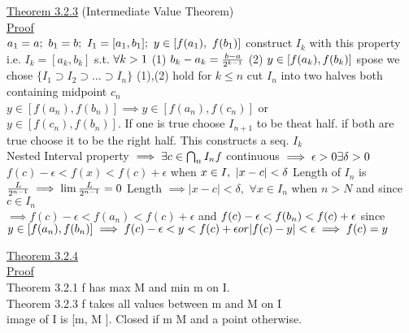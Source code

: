 \documentclass[12pt]{amsart}
\begin{document}
\begin{enumerate}
\underline{Theorem 3.2.3} (Intermediate Value Theorem)\\
\underline{Proof}\\
$a_1 = a;\,\, b_1 = b;\,\, I_1 = [a_1, b_1];\,\, y \in [f(a_1),\,\, f(b_1)]\\$
construct $I_k$ with this property\\
i.e. $I_k = [a_k, b_k]$ s.t. $\forall k >1\\$
(1) $b_k - a_k = \frac{b-a}{2^{k-1}}\\$
(2) $y \in [f(a_k), f(b_k)]\\$
spose we chose $\{ I_1 \supset I_2 \supset \dots \supset I_n \}$ (1),(2) hold for $k \leq n$ cut $I_n$ into two halves both containing midpoint $c_n$\\
$y \in [ f(a_n), f(b_n) ] \implies y \in [ f(a_n), f(c_n)]$ or\\
$y \in [ f(c_n), f(b_n) ]$. If one is true choose $I_{n+1}$ to be theat half. if both are true choose it to be the right half. This constructs a seq. $I_k$\\
Nested Interval property $\implies \exists c \in \bigcap_n I_n\\
f$ continuous $\implies \epsilon >0 \exists \delta >0\\$
$f(c) - \epsilon < f(x) < f(c) + \epsilon$ when $x \in I,\,\, |x-c | <\delta\\$
Length of $I_n$ is $\frac{L}{2^{n-1}} \implies \lim \frac {L}{2^{n-1}} = 0\\$
Length $\implies |x-c | < \delta,\,\, \forall x \in I_n$ when $n>N$ and since $c \in I_n$\\
$\implies f(c) - \epsilon < f(a_n) < f(c) + \epsilon$ and $f(c) - \epsilon < f(b_n) < f(c) + \epsilon\\$
since $y \in [ f(a_n), f(b_n)]\\
\implies f(c) - \epsilon < y < f(c) + \epsilon or |f(c) - y | < \epsilon\\
\implies f(c) = y$


\hdashrule[0.5ex][c]{\linewidth}{0.5pt}{1.5mm}


\underline{Theorem 3.2.4}\\
\underline{Proof}\\
Theorem 3.2.1 \implies f has max M and min m on I.\\
Theorem 3.2.3 f takes all values between m and M on I \\
\implies image of I is [m, M ]. Closed if m \neq M and a point otherwise.\\



\end{enumerate}
\end{document}
